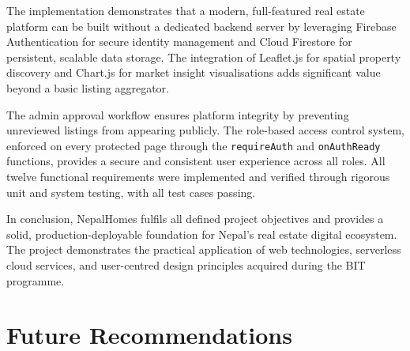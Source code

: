 \documentclass[12pt,a4paper]{report}
\begin{document}
The implementation demonstrates that a modern, full-featured real estate platform
can be built without a dedicated backend server by leveraging Firebase
Authentication for secure identity management and Cloud Firestore for persistent,
scalable data storage. The integration of Leaflet.js for spatial property
discovery and Chart.js for market insight visualisations adds significant value
beyond a basic listing aggregator.

The admin approval workflow ensures platform integrity by preventing unreviewed
listings from appearing publicly. The role-based access control system, enforced
on every protected page through the \texttt{requireAuth} and \texttt{onAuthReady}
functions, provides a secure and consistent user experience across all roles.
All twelve functional requirements were implemented and verified through rigorous
unit and system testing, with all test cases passing.

In conclusion, NepalHomes fulfils all defined project objectives and provides a
solid, production-deployable foundation for Nepal's real estate digital ecosystem.
The project demonstrates the practical application of web technologies, serverless
cloud services, and user-centred design principles acquired during the BIT
programme.

\section{Future Recommendations}
\end{document}
